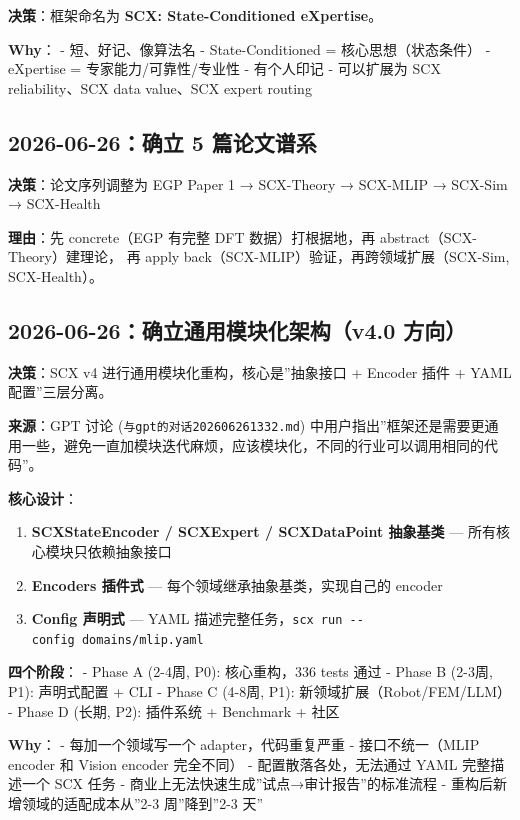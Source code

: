 \documentclass[
  12pt,
]{ctexart}
\providecommand{\tightlist}{%
  \setlength{\itemsep}{0pt}\setlength{\parskip}{0pt}}
\begin{document}
\textbf{决策}：框架命名为 \textbf{SCX: State-Conditioned eXpertise}。

\textbf{Why}： - 短、好记、像算法名 - State-Conditioned =
核心思想（状态条件） - eXpertise = 专家能力/可靠性/专业性 - 有个人印记 -
可以扩展为 SCX reliability、SCX data value、SCX expert routing

\subsection{2026-06-26：确立 5
篇论文谱系}\label{ux786eux7acb-5-ux7bc7ux8bbaux6587ux8c31ux7cfb}

\textbf{决策}：论文序列调整为 EGP Paper 1 → SCX-Theory → SCX-MLIP →
SCX-Sim → SCX-Health

\textbf{理由}：先 concrete（EGP 有完整 DFT 数据）打根据地，再
abstract（SCX-Theory）建理论， 再 apply
back（SCX-MLIP）验证，再跨领域扩展（SCX-Sim, SCX-Health）。

\subsection{2026-06-26：确立通用模块化架构（v4.0
方向）}\label{ux786eux7acbux901aux7528ux6a21ux5757ux5316ux67b6ux6784v4.0-ux65b9ux5411}

\textbf{决策}：SCX v4 进行通用模块化重构，核心是''抽象接口 + Encoder
插件 + YAML 配置''三层分离。

\textbf{来源}：GPT 讨论 (\texttt{与gpt的对话202606261332.md})
中用户指出''框架还是需要更通用一些，避免一直加模块迭代麻烦，应该模块化，不同的行业可以调用相同的代码''。

\textbf{核心设计}：

\begin{enumerate}
\def\labelenumi{\arabic{enumi}.}
\tightlist
\item
  \textbf{SCXStateEncoder / SCXExpert / SCXDataPoint 抽象基类} ---
  所有核心模块只依赖抽象接口
\item
  \textbf{Encoders 插件式} --- 每个领域继承抽象基类，实现自己的 encoder
\item
  \textbf{Config 声明式} --- YAML
  描述完整任务，\texttt{scx\ run\ -\/-config\ domains/mlip.yaml}
\end{enumerate}

\textbf{四个阶段}： - Phase A (2-4周, P0): 核心重构，336 tests 通过 -
Phase B (2-3周, P1): 声明式配置 + CLI - Phase C (4-8周, P1):
新领域扩展（Robot/FEM/LLM） - Phase D (长期, P2): 插件系统 + Benchmark +
社区

\textbf{Why}： - 每加一个领域写一个 adapter，代码重复严重 -
接口不统一（MLIP encoder 和 Vision encoder 完全不同） -
配置散落各处，无法通过 YAML 完整描述一个 SCX 任务 -
商业上无法快速生成''试点→审计报告''的标准流程 -
重构后新增领域的适配成本从''2-3 周''降到''2-3 天''
\end{document}
